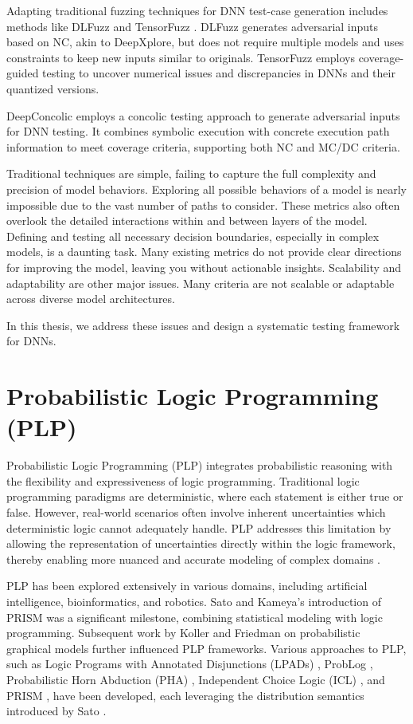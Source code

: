 Adapting traditional fuzzing techniques for DNN test-case generation includes methods like DLFuzz \cite{dlfuzz} and TensorFuzz \cite{tensorfuzz}. DLFuzz generates adversarial inputs based on NC, akin to DeepXplore, but does not require multiple models and uses constraints to keep new inputs similar to originals. TensorFuzz employs coverage-guided testing to uncover numerical issues and discrepancies in DNNs and their quantized versions.

DeepConcolic \cite{deepconcolic} employs a concolic testing approach to generate adversarial inputs for DNN testing. It combines symbolic execution with concrete execution path information to meet coverage criteria, supporting both NC and MC/DC criteria.

Traditional techniques are simple, failing to capture the full complexity and precision of model behaviors. Exploring all possible behaviors of a model is nearly impossible due to the vast number of paths to consider. These metrics also often overlook the detailed interactions within and between layers of the model. Defining and testing all necessary decision boundaries, especially in complex models, is a daunting task. Many existing metrics do not provide clear directions for improving the model, leaving you without actionable insights. Scalability and adaptability are other major issues. Many criteria are not scalable or adaptable across diverse model architectures.

In this thesis, we address these issues and design a systematic testing framework for DNNs.





\section{Probabilistic Logic Programming (PLP)}

Probabilistic Logic Programming (PLP) integrates probabilistic reasoning with the flexibility and expressiveness of logic programming. Traditional logic programming paradigms are deterministic, where each statement is either true or false. However, real-world scenarios often involve inherent uncertainties which deterministic logic cannot adequately handle. PLP addresses this limitation by allowing the representation of uncertainties directly within the logic framework, thereby enabling more nuanced and accurate modeling of complex domains \cite{Sato2001, Kimmig2011}.

PLP has been explored extensively in various domains, including artificial intelligence, bioinformatics, and robotics. Sato and Kameya's introduction of PRISM \cite{Sato1997} was a significant milestone, combining statistical modeling with logic programming. Subsequent work by Koller and Friedman \cite{Koller2009} on probabilistic graphical models further influenced PLP frameworks. Various approaches to PLP, such as Logic Programs with Annotated Disjunctions (LPADs) \cite{Vennekens2004}, ProbLog \cite{DeRaedt2007}, Probabilistic Horn Abduction (PHA) \cite{Poole1993}, Independent Choice Logic (ICL) \cite{Poole1997}, and PRISM \cite{Sato2001}, have been developed, each leveraging the distribution semantics introduced by Sato \cite{Sato2001}.

